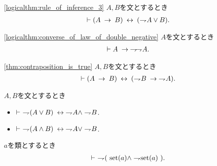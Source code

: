 	\begin{screen}
		\begin{logicalthm}[含意は否定と論理和で表せる]
		\ref{logicalthm:rule_of_inference_3}
			$A,B$を文とするとき
			\begin{align}
				\vdash (A \hspace{0.25em}\rightarrow\hspace{0.25em} B) \hspace{0.25em}\leftrightarrow\hspace{0.25em} (\rightharpoondown\hspace{-0.25em} A \vee B).
			\end{align}
		\end{logicalthm}
	\end{screen}
	
	\begin{screen}
		\begin{logicalthm}[二重否定の法則の逆が成り立つ]
		\ref{logicalthm:converse_of_law_of_double_negative}
			$A$を文とするとき
			\begin{align}
				\vdash A \hspace{0.25em}\rightarrow\hspace{0.25em} \rightharpoondown\hspace{-0.25em} \rightharpoondown\hspace{-0.25em} A.
			\end{align}
		\end{logicalthm}
	\end{screen}
	
	\begin{screen}
		\begin{logicalthm}[対偶命題は同値]\ref{thm:contraposition_is_true}
			$A,B$を文とするとき
			\begin{align}
				\vdash (A \hspace{0.25em}\rightarrow\hspace{0.25em} B) \hspace{0.25em}\leftrightarrow\hspace{0.25em} (\rightharpoondown\hspace{-0.25em} B \hspace{0.25em}\rightarrow\hspace{0.25em} \rightharpoondown\hspace{-0.25em} A).
			\end{align}
		\end{logicalthm}
	\end{screen}
	
	\begin{screen}
		\begin{logicalthm}[De Morganの法則]
			$A,B$を文とするとき
			\begin{itemize}
				\item $\vdash\ \rightharpoondown\hspace{-0.25em} (A \vee B) \hspace{0.25em}\leftrightarrow\hspace{0.25em} \rightharpoondown\hspace{-0.25em} A \wedge \rightharpoondown\hspace{-0.25em} B$.
			
				\item $\vdash\ \rightharpoondown\hspace{-0.25em} (A \wedge B) \hspace{0.25em}\leftrightarrow\hspace{0.25em} \rightharpoondown\hspace{-0.25em} A \vee \rightharpoondown\hspace{-0.25em} B$.
			\end{itemize}
		\end{logicalthm}
	\end{screen}
	
	\begin{screen}
		\begin{thm}[集合であり真類でもある類は存在しない]
			$a$を類とするとき
			\begin{align}
				\vdash\ \negation (\ \set{a} \wedge \negation \set{a}\ ).
			\end{align}
		\end{thm}
	\end{screen}
	
